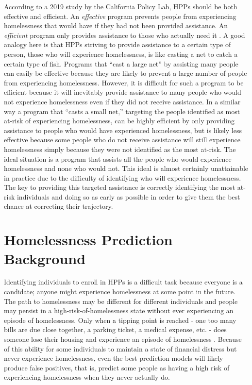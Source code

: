 \documentclass[12pt]{report}
\begin{document}
According to a 2019 study by the California Policy Lab, HPPs should be both effective and efficient. An \textit{effective} program prevents people from experiencing homelessness that would have if they had not been provided assistance. An \textit{efficient} program only provides assistance to those who actually need it \cite{PredictPreventHmlsnsLA}. A good analogy here is that HPPs striving to provide assistance to a certain type of person, those who will experience homelessness, is like casting a net to catch a certain type of fish. Programs that ``cast a large net'' by assisting many people can easily be effective because they are likely to prevent a large number of people from experiencing homelessness. However, it is difficult for such a program to be efficient because it will inevitably provide assistance to many people who would not experience homelessness even if they did not receive assistance. In a similar way a program that ``casts a small net,'' targeting the people identified as most at-risk of experiencing homelessness, can be highly efficient by only providing assistance to people who would have experienced homelessness, but is likely less effective because some people who do not receive assistance will still experience homelessness simply because they were not identified as the most at-risk. The ideal situation is a program that assists all the people who would experience homelessness and none who would not. This ideal is almost certainly unattainable in practice due to the difficulty of identifying who will experience homelessness. The key to providing this targeted assistance is correctly identifying the most at-risk individuals and doing so as early as possible in order to give them the best chance at correcting their trajectory.

\section{Homelessness Prediction Background}
Identifying individuals to enroll in HPPs is a difficult task because everyone is a candidate; anyone might experience homelessness at some point in the future. The path to homelessness may be different for different individuals and people may persist in a high-risk-of-homelessness state without ever experiencing an episode of homelessness. Only when a tipping point is reached - one too many bills are due close together, a parking ticket, a medical expense, etc. - does someone lose their housing and experience an episode of homelessness \cite{o2004wrong}. Because of this ability for some individuals to maintain a state of financial distress but never experience homelessness, even the best prediction models will likely produce false positives, that is, predict some people as having a high risk of experiencing homelessness when they never actually do.
\end{document}

